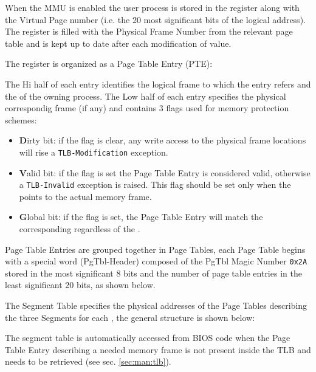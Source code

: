 When the MMU is enabled the user process  is stored in the  register along with the Virtual Page number (i.e. the 20 most significant bits of the logical address). The  register is filled with the Physical Frame Number from the relevant page table and is kept up to date after each modification of  value.

\label{sec:man:pageTable}
The  register is organized as a Page Table Entry (PTE):


The Hi half of each entry identifies the logical frame to which the entry refers and the  of the owning process.
The Low half of each entry specifies the physical correspondig frame (if any) and contains 3 flags used for memory protection schemes:
\begin{itemize}
	\item \textbf{D}irty bit: if the flag is clear, any write access to the physical frame locations will rise a \texttt{TLB-Modification} exception.
\item \textbf{V}alid bit: if the flag is set the Page Table Entry is considered valid, otherwise a \texttt{TLB-Invalid} exception is raised.
	This flag should be set only when the  points to the actual memory frame.
\item \textbf{G}lobal bit: if the flag is set, the Page Table Entry will match the corresponding  regardless of the .
\end{itemize}

Page Table Entries are grouped together in Page Tables, each Page Table begins with a special word (PgTbl-Header) composed of the PgTbl Magic Number \texttt{0x2A} stored in the most significant 8 bits and the number of page table entries in the least significant 20 bits, as shown below.



\label{sec:man:segmentTable}
The Segment Table specifies the physical addresses of the Page Tables describing the three Segments for each , the general structure is shown below:


The segment table is automatically accessed from BIOS code when the Page Table Entry describing a needed memory frame is not present inside the TLB and needs to be retrieved (see sec. \ref{sec:man:tlb}).

